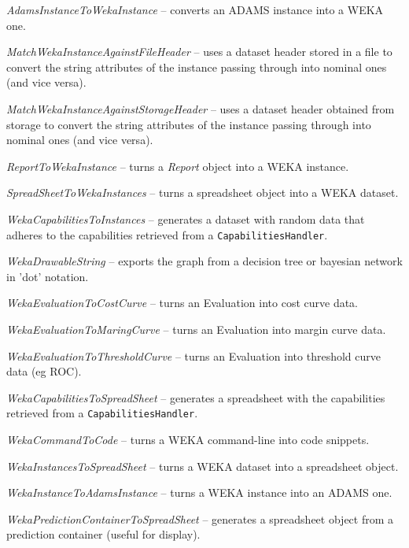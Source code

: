 \begin{tight_itemize}
	\item \textit{AdamsInstanceToWekaInstance} -- converts an ADAMS instance
	into a WEKA one.
	\item \textit{MatchWekaInstanceAgainstFileHeader} -- uses a dataset header
	stored in a file to convert the string attributes of the instance passing 
	through into nominal ones (and vice versa).
	\item \textit{MatchWekaInstanceAgainstStorageHeader} -- uses a dataset
	header obtained from storage to convert the string attributes of the 
	instance passing through into nominal ones (and vice versa).
	\item \textit{ReportToWekaInstance} -- turns a \textit{Report} object
	into a WEKA instance.
	\item \textit{SpreadSheetToWekaInstances} -- turns a spreadsheet object
	into a WEKA dataset.
	\item \textit{WekaCapabilitiesToInstances} -- generates a dataset with
	random data that adheres to the capabilities retrieved from a
	\texttt{CapabilitiesHandler}.
	\item \textit{WekaDrawableString} -- exports the graph from a decision
	tree or bayesian network in 'dot' notation.
	\item \textit{WekaEvaluationToCostCurve} -- turns an Evaluation into
	cost curve data.
	\item \textit{WekaEvaluationToMaringCurve} -- turns an Evaluation into
	margin curve data.
	\item \textit{WekaEvaluationToThresholdCurve} -- turns an Evaluation into
	threshold curve data (eg ROC).
	\item \textit{WekaCapabilitiesToSpreadSheet} -- generates a spreadsheet
	with the  capabilities retrieved from a \texttt{CapabilitiesHandler}.
	\item \textit{WekaCommandToCode} -- turns a WEKA command-line into
	code snippets.
	\item \textit{WekaInstancesToSpreadSheet} -- turns a WEKA dataset into
	a spreadsheet object.
	\item \textit{WekaInstanceToAdamsInstance} -- turns a WEKA instance into
	an ADAMS one.
	\item \textit{WekaPredictionContainerToSpreadSheet} -- generates a 
	spreadsheet object from a prediction container (useful for display).
\end{tight_itemize}

